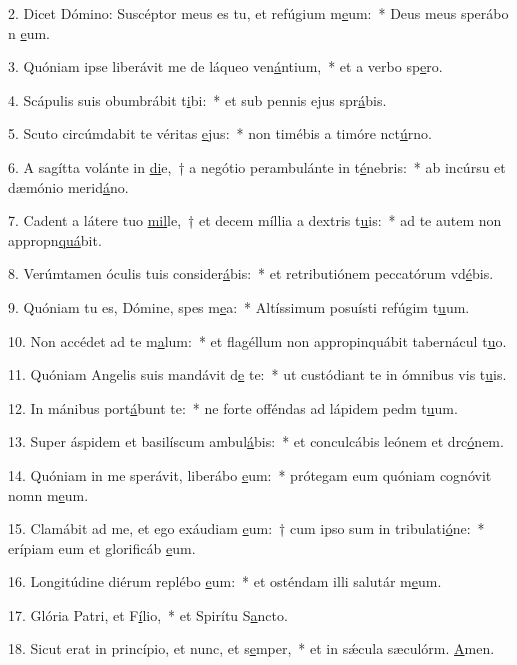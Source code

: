 2. Dicet Dómino: Suscéptor meus es tu, et refúgium m\uline{e}um:~* Deus meus sperábo n \uline{e}um.\par 
3. Quóniam ipse liberávit me de láqueo ven\uline{á}ntium,~* et a verbo sp\uline{e}ro.\par 
4. Scápulis suis obumbrábit t\uline{i}bi:~* et sub pennis ejus spr\uline{á}bis.\par 
5. Scuto circúmdabit te véritas \uline{e}jus:~* non timébis a timóre nct\uline{ú}rno.\par 
6. A sagítta volánte in \uline{di}e,~† a negótio perambulánte in t\uline{é}nebris:~* ab incúrsu et dæmónio merid\uline{á}no.\par 
7. Cadent a látere tuo \uline{mil}le,~† et decem míllia a dextris t\uline{u}is:~* ad te autem non appropn\uline{quá}bit.\par 
8. Verúmtamen óculis tuis consider\uline{á}bis:~* et retributiónem peccatórum vd\uline{é}bis.\par 
9. Quóniam tu es, Dómine, spes m\uline{e}a:~* Altíssimum posuísti refúgim t\uline{u}um.\par 
10. Non accédet ad te m\uline{a}lum:~* et flagéllum non appropinquábit tabernácul t\uline{u}o.\par 
11. Quóniam Angelis suis mandávit d\uline{e} te:~* ut custódiant te in ómnibus vis t\uline{u}is.\par 
12. In mánibus port\uline{á}bunt te:~* ne forte offéndas ad lápidem pedm t\uline{u}um.\par 
13. Super áspidem et basilíscum ambul\uline{á}bis:~* et conculcábis leónem et drc\uline{ó}nem.\par 
14. Quóniam in me sperávit, liberábo \uline{e}um:~* prótegam eum quóniam cognóvit nomn m\uline{e}um.\par 
15. Clamábit ad me, et ego exáudiam \uline{e}um:~† cum ipso sum in tribulati\uline{ó}ne:~* erípiam eum et glorificáb \uline{e}um.\par 
16. Longitúdine diérum replébo \uline{e}um:~* et osténdam illi salutár m\uline{e}um.\par 
17. Glória Patri, et F\uline{í}lio,~* et Spirítu S\uline{a}ncto.\par 
18. Sicut erat in princípio, et nunc, et s\uline{e}mper,~* et in sǽcula sæculórm. \uline{A}men.\par 
